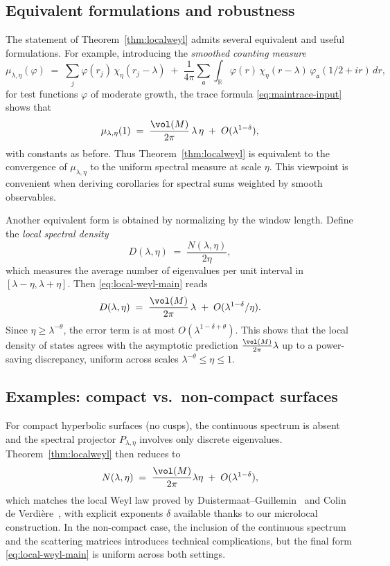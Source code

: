 

\subsection{Equivalent formulations and robustness}
The statement of Theorem~\ref{thm:localweyl} admits several equivalent and useful formulations. For example, introducing the \emph{smoothed counting measure}
\[
\mu_{\lambda,\eta}(\varphi) \;=\; \sum_j \varphi(r_j)\,\chi_\eta(r_j-\lambda)
\;+\;\frac{1}{4\pi}\sum_{\mathfrak{a}}\int_{\mathbb{R}}
\varphi(r)\,\chi_\eta(r-\lambda)\,\varphi_{\mathfrak{a}}(1/2+ir)\,dr,
\]
for test functions $\varphi$ of moderate growth, the trace formula \eqref{eq:maintrace-input} shows that
\begin{equation}\label{eq:measure-form}
\mu_{\lambda,\eta}(1)\;=\;\frac{\vol(M)}{2\pi}\,\lambda\,\eta
\;+\;O(\lambda^{1-\delta}),
\end{equation}
with constants as before. Thus Theorem~\ref{thm:localweyl} is equivalent to the convergence of $\mu_{\lambda,\eta}$ to the uniform spectral measure at scale $\eta$. This viewpoint is convenient when deriving corollaries for spectral sums weighted by smooth observables.

Another equivalent form is obtained by normalizing by the window length. Define the \emph{local spectral density}
\[
D(\lambda,\eta)\;=\;\frac{N(\lambda,\eta)}{2\eta},
\]
which measures the average number of eigenvalues per unit interval in $[\lambda-\eta,\lambda+\eta]$. Then \eqref{eq:local-weyl-main} reads
\begin{equation}\label{eq:density-form}
D(\lambda,\eta)\;=\;\frac{\vol(M)}{2\pi}\,\lambda\;+\;O(\lambda^{1-\delta}/\eta).
\end{equation}
Since $\eta\ge \lambda^{-\theta}$, the error term is at most $O(\lambda^{1-\delta+\theta})$. This shows that the local density of states agrees with the asymptotic prediction $\frac{\vol(M)}{2\pi}\lambda$ up to a power-saving discrepancy, uniform across scales $\lambda^{-\theta}\le \eta\le 1$.

\subsection{Examples: compact vs.\ non-compact surfaces}
For compact hyperbolic surfaces (no cusps), the continuous spectrum is absent and the spectral projector $P_{\lambda,\eta}$ involves only discrete eigenvalues. Theorem~\ref{thm:localweyl} then reduces to
\[
N(\lambda,\eta)\;=\;\frac{\vol(M)}{2\pi}\lambda\eta\;+\;O(\lambda^{1-\delta}),
\]
which matches the local Weyl law proved by Duistermaat–Guillemin~\cite{DG1975} and Colin de Verdière~\cite{ColindeVerdiere1985}, with explicit exponents $\delta$ available thanks to our microlocal construction. In the non-compact case, the inclusion of the continuous spectrum and the scattering matrices introduces technical complications, but the final form \eqref{eq:local-weyl-main} is uniform across both settings.

